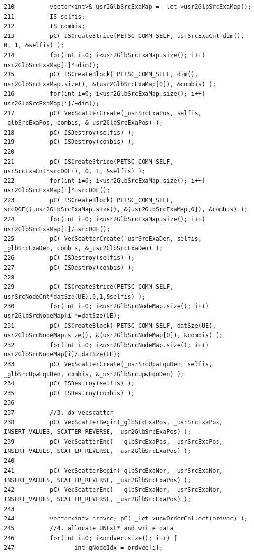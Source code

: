 \begin{verbatim}
210          vector<int>& usr2GlbSrcExaMap = _let->usr2GlbSrcExaMap();
211          IS selfis;
212          IS combis;
213          pC( ISCreateStride(PETSC_COMM_SELF, usrSrcExaCnt*dim(), 0, 1, &selfis) );
214          for(int i=0; i<usr2GlbSrcExaMap.size(); i++) usr2GlbSrcExaMap[i]*=dim();
215          pC( ISCreateBlock( PETSC_COMM_SELF, dim(), usr2GlbSrcExaMap.size(), &(usr2GlbSrcExaMap[0]), &combis) );
216          for(int i=0; i<usr2GlbSrcExaMap.size(); i++) usr2GlbSrcExaMap[i]/=dim();
217          pC( VecScatterCreate(_usrSrcExaPos, selfis, _glbSrcExaPos, combis, &_usr2GlbSrcExaPos) );
218          pC( ISDestroy(selfis) );
219          pC( ISDestroy(combis) );
220          
221          pC( ISCreateStride(PETSC_COMM_SELF, usrSrcExaCnt*srcDOF(), 0, 1, &selfis) );
222          for(int i=0; i<usr2GlbSrcExaMap.size(); i++) usr2GlbSrcExaMap[i]*=srcDOF();
223          pC( ISCreateBlock( PETSC_COMM_SELF, srcDOF(),usr2GlbSrcExaMap.size(), &(usr2GlbSrcExaMap[0]), &combis) );
224          for(int i=0; i<usr2GlbSrcExaMap.size(); i++) usr2GlbSrcExaMap[i]/=srcDOF();
225          pC( VecScatterCreate(_usrSrcExaDen, selfis, _glbSrcExaDen, combis, &_usr2GlbSrcExaDen) );
226          pC( ISDestroy(selfis) );
227          pC( ISDestroy(combis) );
228          
229          pC( ISCreateStride(PETSC_COMM_SELF, usrSrcNodeCnt*datSze(UE),0,1,&selfis) );
230          for(int i=0; i<usr2GlbSrcNodeMap.size(); i++) usr2GlbSrcNodeMap[i]*=datSze(UE);
231          pC( ISCreateBlock( PETSC_COMM_SELF, datSze(UE), usr2GlbSrcNodeMap.size(), &(usr2GlbSrcNodeMap[0]), &combis) );
232          for(int i=0; i<usr2GlbSrcNodeMap.size(); i++) usr2GlbSrcNodeMap[i]/=datSze(UE);
233          pC( VecScatterCreate(_usrSrcUpwEquDen, selfis, _glbSrcUpwEquDen, combis, &_usr2GlbSrcUpwEquDen) );
234          pC( ISDestroy(selfis) );
235          pC( ISDestroy(combis) );
236          
237          //3. do vecscatter
238          pC( VecScatterBegin(_glbSrcExaPos, _usrSrcExaPos, INSERT_VALUES, SCATTER_REVERSE, _usr2GlbSrcExaPos) );
239          pC( VecScatterEnd(  _glbSrcExaPos, _usrSrcExaPos, INSERT_VALUES, SCATTER_REVERSE, _usr2GlbSrcExaPos) );
240          
241          pC( VecScatterBegin(_glbSrcExaNor, _usrSrcExaNor, INSERT_VALUES, SCATTER_REVERSE, _usr2GlbSrcExaPos) );
242          pC( VecScatterEnd(  _glbSrcExaNor, _usrSrcExaNor, INSERT_VALUES, SCATTER_REVERSE, _usr2GlbSrcExaPos) );
243          
244          vector<int> ordvec; pC( _let->upwOrderCollect(ordvec) );
245          //4. allocate UNExt* and write data
246          for(int i=0; i<ordvec.size(); i++) {
247                 int gNodeIdx = ordvec[i];

\end{verbatim}
